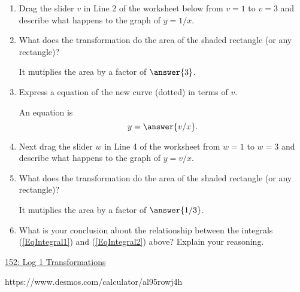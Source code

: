 \documentclass{ximera}
\begin{document}
\begin{exploration}  \label{Ex:LdkDERer4}

\begin{enumerate}
\item Drag the slider $v$ in Line 2 of the worksheet below from $v=1$ to $v=3$ and describe what happens to the graph of $y=1/x$.

\begin{freeResponse}
\end{freeResponse}

\item What does the transformation do the area of the shaded rectangle (or any rectangle)?

It mutiplies the area by a factor of $\answer{3}$.

\item Express a equation of the new curve (dotted) in terms of $v$.

An equation is
\[
 y = \answer{v/x}.
\]


\item Next drag the slider $w$ in Line 4 of the worksheet from $w=1$ to $w=3$ and describe what happens to the graph of $y=v/x$.

\begin{freeResponse}
\end{freeResponse}

\item What does the transformation do the area of the shaded rectangle (or any rectangle)?

It mutiplies the area by a factor of $\answer{1/3}$.

\item What is your conclusion about the relationship between the integrals (\ref{EqIntegral1}) and (\ref{EqIntegral2}) above? Explain your reasoning. 

\begin{freeResponse}
\end{freeResponse}



\end{enumerate}

\begin{onlineOnly}
    \begin{center}
\end{center}
\end{onlineOnly}

\href{https://www.desmos.com/calculator/al95rowj4h}{152: Log 1 Transformations}


https://www.desmos.com/calculator/al95rowj4h


\end{exploration}
\end{document}
